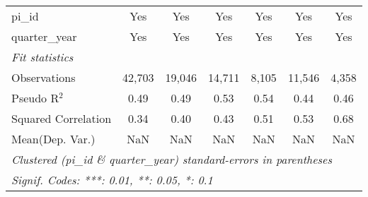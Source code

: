 \begin{tabular}{lcccccc}
   pi\_id                                                     & Yes           & Yes           & Yes            & Yes           & Yes         & Yes\\  
   quarter\_year                                              & Yes           & Yes           & Yes            & Yes           & Yes         & Yes\\  
   \midrule
   \emph{Fit statistics}\\
   Observations                                               & 42,703        & 19,046        & 14,711         & 8,105         & 11,546      & 4,358\\  
   Pseudo R$^2$                                               & 0.49          & 0.49          & 0.53           & 0.54          & 0.44        & 0.46\\  
   Squared Correlation                                        & 0.34          & 0.40          & 0.43           & 0.51          & 0.53        & 0.68\\  
Mean(Dep. Var.) & NaN & NaN & NaN & NaN & NaN & NaN \\
   \midrule \midrule
   \multicolumn{7}{l}{\emph{Clustered (pi\_id \& quarter\_year) standard-errors in parentheses}}\\
   \multicolumn{7}{l}{\emph{Signif. Codes: ***: 0.01, **: 0.05, *: 0.1}}\\
\end{tabular}
\par\endgroup

